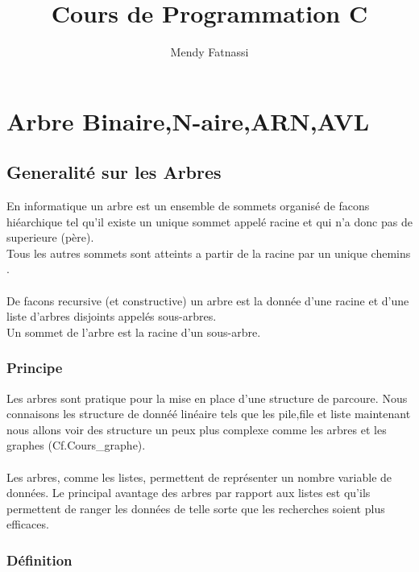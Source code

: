 \documentclass[a4paper,12pt,openany]{book}
\author{Mendy Fatnassi}
\title{Cours de Programmation C}
\begin{document}
\maketitle
\tableofcontents

\chapter{Arbre Binaire,N-aire,ARN,AVL}

\section{Generalité sur les Arbres}

En informatique un arbre est un ensemble de sommets organisé de facons hiéarchique tel qu'il existe un unique sommet appelé racine et qui n'a donc pas de superieure (père).\\
Tous les autres sommets sont atteints a partir de la racine par un unique chemins .\\
\\
De facons recursive (et constructive) un arbre est la donnée d'une racine et d'une liste d'arbres disjoints appelés sous-arbres.\\
Un sommet de l'arbre est la racine d'un sous-arbre.\\

\subsection{Principe}
Les arbres sont pratique pour la mise en place d'une structure de parcoure. Nous connaisons les structure de donnéé linéaire tels que les pile,file et liste maintenant nous allons voir des structure un peux plus complexe comme les arbres et les graphes (Cf.Cours_graphe).\\
\\
Les arbres, comme les listes, permettent de représenter un nombre variable de données. Le principal avantage des arbres par rapport aux listes est qu’ils permettent de ranger les données de telle sorte que les recherches soient plus efficaces.\\

\subsection{Définition}
\end{document}
